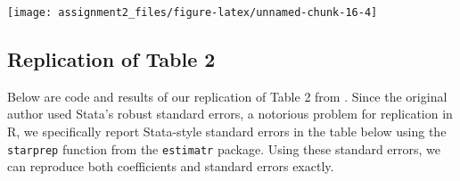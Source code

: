 \documentclass[
  a4paper,
]{article}
\begin{document}
\begin{center}\texttt{[image: assignment2\_files/figure-latex/unnamed-chunk-16-4]} \end{center}

\subsection{Replication of Table 2}\label{replication-of-table-2}

Below are code and results of our replication of Table 2 from
\textcite{valencia2019}. Since the original author used Stata's robust
standard errors, a notorious problem for replication in R, we
specifically report Stata-style standard errors in the table below using
the \texttt{starprep} function from the \texttt{estimatr} package. Using
these standard errors, we can reproduce both coefficients and standard
errors exactly.
\end{document}
